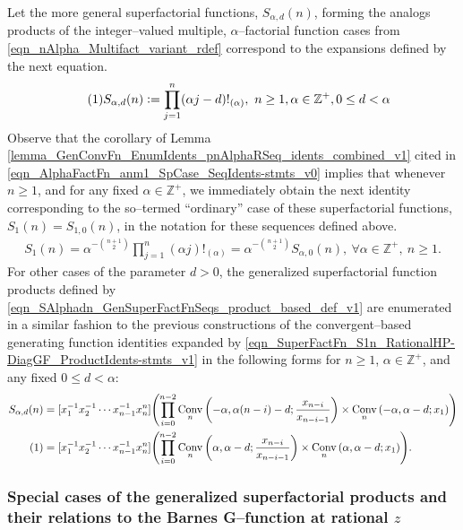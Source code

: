 \documentclass[12pt,reqno]{article}
\numberwithin{sfootnote}{section}
\numberwithin{equation}{section}
\newcommand{\tagonce}[0]{
     \addtocounter{equation}{1}
     \tag{\theequation}
}
\theoremstyle{plain}
\theoremstyle{definition}
\theoremstyle{remark}
\newcommand{\quotetext}[1]{``#1''}
\newcommand{\defequals}{\ensuremath{\vcentcolon=}}
\newcommand{\ConvGF}[4]{\ensuremath{\Conv_{#1}\left(#2, #3; #4\right)}}
\DeclareMathOperator{\Conv}{Conv}
\begin{document}
Let the more general superfactorial functions, $S_{\alpha,d}(n)$, 
forming the analogs products of the integer--valued 
multiple, $\alpha$--factorial function cases from 
\eqref{eqn_nAlpha_Multifact_variant_rdef} 
correspond to the expansions defined by the next equation. 
\begin{align*} 
\tagonce\label{eqn_SAlphadn_GenSuperFactFnSeqs_product_based_def_v1} 
S_{\alpha,d}(n) & \defequals 
     \prod_{j=1}^{n} (\alpha j - d)!_{(\alpha)},\ 
     n \geq 1, \alpha \in \mathbb{Z}^{+}, 0 \leq d < \alpha 
\end{align*} 
Observe that the corollary of 
Lemma \ref{lemma_GenConvFn_EnumIdents_pnAlphaRSeq_idents_combined_v1} 
cited in \eqref{eqn_AlphaFactFn_anm1_SpCase_SeqIdents-stmts_v0} 
implies that 
whenever $n \geq 1$, and for any fixed $\alpha \in \mathbb{Z}^{+}$, 
we immediately obtain the next identity 
corresponding to the so--termed 
\quotetext{ordinary} case of these 
superfactorial functions, $S_1(n) = S_{1,0}(n)$, 
in the notation for these sequences defined above. 
\begin{align*} 
S_1(n) = \alpha^{-\binom{n+1}{2}} 
     \prod_{j=1}^{n} (\alpha j)!_{(\alpha)} = 
     \alpha^{-\binom{n+1}{2}} S_{\alpha,0}(n),\ 
     \forall \alpha \in \mathbb{Z}^{+},\ n \geq 1. 
\end{align*} 
For other cases of the parameter $d > 0$, the 
generalized superfactorial function products defined by 
\eqref{eqn_SAlphadn_GenSuperFactFnSeqs_product_based_def_v1} 
are enumerated in a similar fashion to the previous 
constructions of the convergent--based generating function 
identities expanded by 
\eqref{eqn_SuperFactFn_S1n_RationalHP-DiagGF_ProductIdents-stmts_v1} 
in the following forms for $n \geq 1$, $\alpha \in \mathbb{Z}^{+}$, 
and any fixed $0 \leq d < \alpha$: 
\begin{align*} 
S_{\alpha,d}(n) 
     & = 
     [x_1^{-1} x_2^{-1} \cdots x_{n-1}^{-1} x_n^{n}] 
     \Biggl( 
     \prod_{i=0}^{n-2} 
     \ConvGF{n}{-\alpha}{\alpha(n-i)-d}{\frac{x_{n-i}}{x_{n-i-1}}} \times 
     \ConvGF{n}{-\alpha}{\alpha-d}{x_1} 
     \Biggr) \\ 
\tagonce\label{eqn_SuperFactFn_S1n_RationalHP-DiagGF_ProductIdents-stmts_v2} 
     & = 
     [x_1^{-1} x_2^{-1} \cdots x_{n-1}^{-1} x_n^{n}] 
     \Biggl( 
     \prod_{i=0}^{n-2} 
     \ConvGF{n}{\alpha}{\alpha-d}{\frac{x_{n-i}}{x_{n-i-1}}} \times 
     \ConvGF{n}{\alpha}{\alpha-d}{x_1} 
     \Biggr). 
\end{align*} 

\subsubsection{Special cases of the 
               generalized superfactorial products and their relations to the 
               Barnes G--function at rational $z$} 
\end{document}
